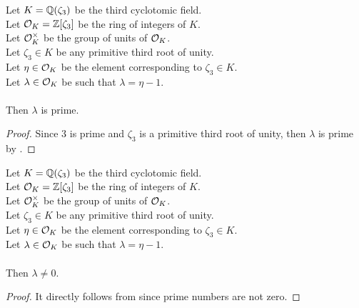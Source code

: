 \begin{lemma}
    \label{lmm:lambda_prime}
    \leanok
    Let $K = \mathbb{Q}(\zeta_3)$ be the third cyclotomic field. \\
    Let $\mathcal{O}_K = \mathbb{Z}[\zeta_3]$ be the ring of integers of $K$. \\
    Let $\mathcal{O}^\times_K$ be the group of units of $\mathcal{O}_K$. \\
    Let $\zeta_3 \in K$ be any primitive third root of unity. \\
    Let $\eta \in \mathcal{O}_K$ be the element corresponding to $\zeta_3 \in K$. \\
    Let $\lambda \in \mathcal{O}_K$ be such that $\lambda = \eta -1$. \\\\
    Then $\lambda$ is prime.
\end{lemma}
\begin{proof}
    \leanok
    Since $3$ is prime and $\zeta_3$ is a primitive third root of unity, then $\lambda$ is prime
    by .
\end{proof}

\begin{lemma}
    \label{lmm:lambda_ne_zero}
    \leanok
    Let $K = \mathbb{Q}(\zeta_3)$ be the third cyclotomic field. \\
    Let $\mathcal{O}_K = \mathbb{Z}[\zeta_3]$ be the ring of integers of $K$. \\
    Let $\mathcal{O}^\times_K$ be the group of units of $\mathcal{O}_K$. \\
    Let $\zeta_3 \in K$ be any primitive third root of unity. \\
    Let $\eta \in \mathcal{O}_K$ be the element corresponding to $\zeta_3 \in K$. \\
    Let $\lambda \in \mathcal{O}_K$ be such that $\lambda = \eta -1$. \\\\
    Then $\lambda \neq 0$.
\end{lemma}
\begin{proof}
    \leanok
    It directly follows from  since prime numbers are not zero.
\end{proof}

